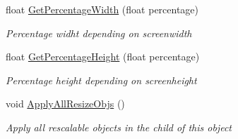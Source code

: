 \begin{DoxyCompactItemize}
float \mbox{\hyperlink{class_dr_evil_1_1_visuals_1_1_u_i___graphic___rescaler_a15a7abe2fa585e1de10bbe42194b3ff7}{Get\+Percentage\+Width}} (float percentage)
\begin{DoxyCompactList}\small\item\em Percentage widht depending on screenwidth \end{DoxyCompactList}\item 
float \mbox{\hyperlink{class_dr_evil_1_1_visuals_1_1_u_i___graphic___rescaler_a36935854a3e45e4d031d4fbc796c83e1}{Get\+Percentage\+Height}} (float percentage)
\begin{DoxyCompactList}\small\item\em Percentage height depending on screenheight \end{DoxyCompactList}\item 
void \mbox{\hyperlink{class_dr_evil_1_1_visuals_1_1_u_i___graphic___rescaler_afd9e39456b5ac585d8ffcaa2d2349551}{Apply\+All\+Resize\+Objs}} ()
\begin{DoxyCompactList}\small\item\em Apply all rescalable objects in the child of this object \end{DoxyCompactList}\end{DoxyCompactItemize}
